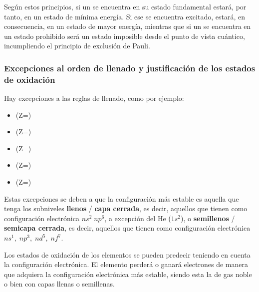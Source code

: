 Según estos principios, si un \el{} se encuentra en su estado fundamental estará, por tanto, en un estado de mínima energía.
Si ese \el{} se encuentra excitado, estará, en consecuencia, en un estado de mayor energía, mientras que si un \el{} se encuentra en un estado prohibido será un estado imposible desde el punto de vista cuántico, incumpliendo el principio de exclusión de Pauli.

\subsubsection{Excepciones al orden de llenado y justificación de los estados de oxidación}

Hay excepciones a las reglas de llenado, como por ejemplo:
\begin{itemize}
    \item {}(Z=) 
    \item {}(Z=) 
    \item {}(Z=) 
    \item {}(Z=) 
    \item {}(Z=) 
\end{itemize}

Estas excepciones se deben a que la configuración más estable es aquella que tenga los subniveles \textbf{llenos} / \textbf{capa cerrada}, es decir, aquellos que tienen como configuración electrónica \(ns^2\; np^6\), a excepción del He (\(1s^2\)), o \textbf{semillenos} / \textbf{semicapa cerrada}, es decir, aquellos que tienen como configuración electrónica \(ns^1, \; np^3, \; nd^5, \; nf^7\).

Los estados de oxidación de los elementos se pueden predecir teniendo en cuenta la configuración electrónica. El elemento perderá o ganará electrones de manera que adquiera la configuración electrónica más estable, siendo esta la de gas noble o bien con capas llenas o semillenas.

